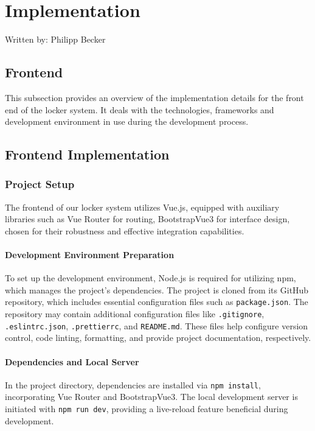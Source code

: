 \section{Implementation}
{\tiny Written by: Philipp Becker}
\subsection{Frontend}
This subsection provides an overview of the implementation details for the front end of the locker system. It deals with the technologies, frameworks and development environment in use during the development process.

\subsection{Frontend Implementation}
\subsubsection{Project Setup}

The frontend of our locker system utilizes Vue.js, equipped with auxiliary libraries such as Vue Router for routing,  BootstrapVue3 for interface design, chosen for their robustness and effective integration capabilities.

\paragraph{Development Environment Preparation}
To set up the development environment, Node.js is required for utilizing npm, which manages the project's dependencies. The project is cloned from its GitHub repository, which includes essential configuration files such as \texttt{package.json}. The repository may contain additional configuration files like \texttt{.gitignore}, \texttt{.eslintrc.json}, \texttt{.prettierrc}, and \texttt{README.md}. These files help configure version control, code linting, formatting, and provide project documentation, respectively.



\paragraph{Dependencies and Local Server}
In the project directory, dependencies are installed via \texttt{npm install}, incorporating Vue Router and BootstrapVue3. The local development server is initiated with \texttt{npm run dev}, providing a live-reload feature beneficial during development.


